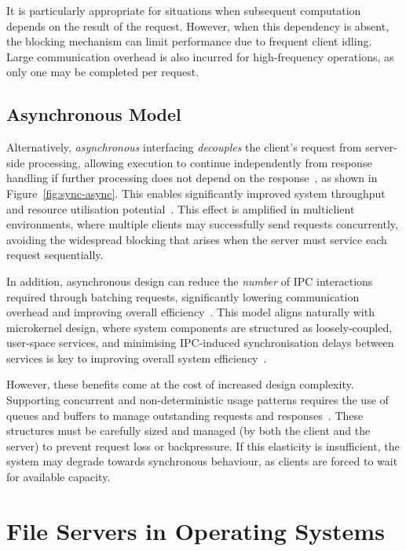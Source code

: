 It is particularly appropriate for situations when subsequent computation depends on the result of the request. However, when this dependency is absent, the blocking mechanism can limit performance due to frequent client idling. Large communication overhead is also incurred for high-frequency operations, as only one may be completed per request. 

\subsection{Asynchronous Model}

Alternatively, \textit{asynchronous} interfacing \textit{decouples} the client’s request from server-side processing, allowing execution to continue independently from response handling if further processing does not depend on the response~\cite{tanenbaum_modern_2015}, as shown in Figure~\ref{fig:sync-async}. This enables significantly improved system throughput and resource utilisation potential~\cite{tang_transparent_2022}. This effect is amplified in multiclient environments, where multiple clients may successfully send requests concurrently, avoiding the widespread blocking that arises when the server must service each request sequentially.

In addition, asynchronous design can reduce the \textit{number} of IPC interactions required through batching requests, significantly lowering communication overhead and improving overall efficiency~\cite{gupta_studying_2024}. This model aligns naturally with microkernel design, where system components are structured as loosely-coupled, user-space services, and minimising IPC-induced synchronisation delays between services is key to improving overall system efficiency~\cite{klimiankou_micro-clk_2021}.

However, these benefits come at the cost of increased design complexity. Supporting concurrent and non-deterministic usage patterns requires the use of queues and buffers to manage outstanding requests and responses~\cite{buffers_yan}. These structures must be carefully sized and managed (by both the client and the server) to prevent request loss or backpressure. If this elasticity is insufficient, the system may degrade towards synchronous behaviour, as clients are forced to wait for available capacity.

\section{File Servers in Operating Systems}
